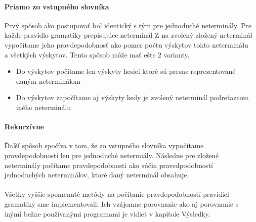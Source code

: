 \paragraph{Priamo zo vstupného slovníka}
Prvý spôsob ako postupovať bol identický s tým pre jednoduché neterminály. Pre každe pravidlo gramatiky prepisujúce neterminál Z na zvolený zložený neterminál vypočítame jeho pravdepodobnosť ako pomer počtu výskytov tohto neterminálu a všetkých výskytov. Tento spôsob môže mať ešte 2 varianty.
\begin{itemize}
	\item Do výskytov počítame len výskyty hesiel ktoré sú presne reprezentované daným neterminálom
	\item Do výskytov započítame aj výskyty kedy je zvolený neterminál podreťazcom iného neterminálu
\end{itemize}

\paragraph{Rekurzívne}
Ďalší spôsob spočíva v tom, že zo vstupného slovníka vypočítame pravdepodobností len pre jednoduché netermiály. Následne pre zložené neterminály počítame pravdepodobnosti ako súčin pravedpodobností jednoduchých neterminálov, ktoré daný neterminál obsahuje.

\paragraph{}
Všetky vyššie spomenuté metódy na počítanie pravdepodobností pravidiel gramatiky sme implementovali. Ich vzájomne porovnanie ako aj porovnanie s inými bežne používanými programami je vidieť v kapitole Výsledky.